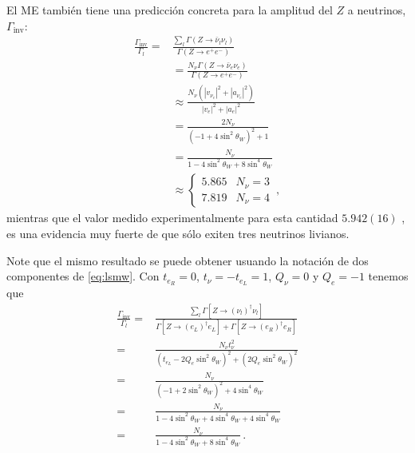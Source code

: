 \begin{frame}
El ME también tiene una predicción concreta para la amplitud del $Z$ a neutrinos, $\Gamma_{\text{inv}}$:
\begin{align}
  \frac{\Gamma_{\text{inv}}}{\Gamma_l}=&\frac{\sum_l\Gamma(Z\to\bar{\nu}_l\nu_l)}{\Gamma(Z\to e^+ e^-)}\nonumber\\
  &=\frac{N_\nu\Gamma(Z\to\bar{\nu}_e\nu_e)}{\Gamma(Z\to e^+ e^-)}\nonumber\\
  &\approx\frac{N_\nu(|v_{\nu_e}|^2+|a_{\nu_e}|^2)}{|v_{e}|^2+|a_{e}|^2}\nonumber\\
  &=\frac{2N_\nu}{(-1+4\sin^2\theta_W)^2+1}\nonumber\\
  &=\frac{N_\nu}{1-4\sin^2\theta_W+8 \sin^4\theta_W}\nonumber\\
  &\approx\begin{cases}
    5.865&N_\nu=3\\
    7.819&N_\nu=4
  \end{cases}\,,
\end{align}
mientras que el valor medido experimentalmente para esta cantidad $5.942(16)$ \cite{a}, es una evidencia muy fuerte de que sólo exiten tres neutrinos livianos. 
\end{frame}

Note que el mismo resultado se puede obtener usuando la notación de dos componentes de \eqref{eq:lsmw}. Con $t_{e_R}=0$, $t_{\nu}=-t_{e_L}=1$, $Q_{\nu}=0$ y $Q_e=-1$ tenemos que
\begin{align}
  \frac{\Gamma_{\text{inv}}}{\Gamma_l}=&\frac{\sum_l\Gamma \left[ Z\to \left( \nu_l \right)^{\dagger}\nu_l \right]}{\Gamma \left[Z\to \left( e_L \right)^{\dagger} e_L  \right]+\Gamma \left[Z\to \left( e_R \right)^{\dagger} e_R  \right]}\nonumber\\
=&\frac{N_{\nu} t_{\nu}^2 }{\left( t_{e_L} - 2 Q_e \sin^2\theta_W \right)^2+ \left( 2 Q_e \sin^2\theta_W \right)^2 } \nonumber\\
=&\frac{N_{\nu} }{\left( -1 + 2 \sin^2\theta_W \right)^2+4 \sin^4\theta_W } \nonumber\\
=&\frac{N_{\nu} }{1 - 4 \sin^2\theta_W +4 \sin^4\theta_W +4 \sin^4\theta_W } \nonumber\\
=&\frac{N_{\nu} }{1 - 4 \sin^2\theta_W +8 \sin^4\theta_W } \,.
\end{align}

